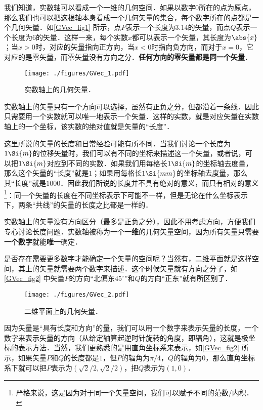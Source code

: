 我们知道，实数轴可以看成一个一维的几何空间．如果以数字$0$所在的点为原点，那么我们也可以把这根轴本身看成一个几何矢量的集合，每个数字所在的点都是一个几何矢量．如\autoref{GVec_fig1} 所示，点$P$表示一个长度为$3.14$的矢量，而点$Q$表示一个长度为$6$的矢量．这样一来，每个实数$x$都可以表示一个矢量，其长度为$\abs{x}$；当$x>0$时，对应的矢量指向正方向，当$x<0$时指向负方向，而对于$x=0$，它对应的是零矢量，而零矢量没有方向之分．\textbf{任何方向的零矢量都是同一个矢量}．

\begin{figure}[ht]
\centering
\texttt{[image: ./figures/GVec\_1.pdf]}
\caption{实数轴上的几何矢量．} \label{GVec_fig1}
\end{figure}

实数轴上的矢量只有一个方向可以选择，虽然有正负之分，但都沿着一条线．因此只需要用一个实数就可以唯一地表示一个矢量．这样的实数，就是对应矢量在实数轴上的一个坐标，该实数的绝对值就是矢量的“长度”．


这里所说的矢量的长度和日常经验可能有所不同．当我们讨论一个长度为$1\Si{m}$的位移矢量时，我们可以有不同的坐标来描述这一个矢量，或者说，可以把$1\Si{m}$对应到不同的实数．如果我们用每格长$1\Si{m}$的坐标轴去度量，那么这个矢量的“长度”就是$1$；如果用每格长$1\Si{mm}$的坐标轴去度量，那么其“长度”就是$1000$．因此我们所说的长度并不具有绝对的意义，而只有相对的意义\footnote{严格来说，这是因为对于同一个矢量空间，我们可以赋予不同的范数/内积．}：同一个矢量的长度在不同坐标表示下可能不一样，但是无论在什么坐标表示下，两条“共线”的矢量的长度之比都是一样的．


实数轴上的矢量没有方向区分（最多是正负之分），因此不用考虑方向，方便我们专心讨论长度问题．实数轴被称为一个\textbf{一维}的几何矢量空间，因为所有矢量只需要\textbf{一个数字}就能\textbf{唯一}确定．

是否存在需要更多数字才能确定一个矢量的空间呢？当然有，二维平面就是这样空间，其上的矢量就需要两个数字来描述．这个时候矢量就有方向之分了，如\autoref{GVec_fig2} 中矢量$P$的方向“北偏东$45^\circ$”和$Q$的方向“正东”就有所区别了．

\begin{figure}[ht]
\centering
\texttt{[image: ./figures/GVec\_2.pdf]}
\caption{二维平面上的几何矢量．} \label{GVec_fig2}
\end{figure}

因为矢量是“具有长度和方向”的量，我们可以用一个数字来表示矢量的长度，一个数字来表示矢量的方向（从给定轴算起逆时针旋转的角度，即辐角），这就是极坐标的表示方法．当然，我们更熟悉的是用直角坐标系来表示，如\autoref{GVec_fig2} 所示，如果矢量$P$和$Q$的长度都是$1$，但$P$的辐角为$\pi/4$，$Q$的辐角为$0$，那么直角坐标系下就可以把$P$表示为$(\sqrt{2}/2, \sqrt{2}/2)$，把$Q$表示为$(1, 0)$．

